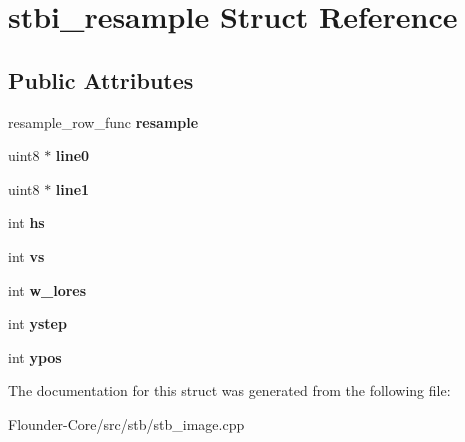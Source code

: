 \hypertarget{structstbi__resample}{}\section{stbi\+\_\+resample Struct Reference}
\label{structstbi__resample}
\subsection*{Public Attributes}
\begin{DoxyCompactItemize}
\item 
\mbox{\label{structstbi__resample_a94091463ebc5933cdaf7a813025b6e19}} 
resample\+\_\+row\+\_\+func {\bfseries resample}
\item 
\mbox{\label{structstbi__resample_a30c51395efffb663b183d7c64def6db3}} 
uint8 $\ast$ {\bfseries line0}
\item 
\mbox{\label{structstbi__resample_ac1165a6da3cf652b951056667f89b1f2}} 
uint8 $\ast$ {\bfseries line1}
\item 
\mbox{\label{structstbi__resample_a1513390ba0102364169a52ff26d5e0f2}} 
int {\bfseries hs}
\item 
\mbox{\label{structstbi__resample_a331c717f53239339c0c678f92a7bf4d5}} 
int {\bfseries vs}
\item 
\mbox{\label{structstbi__resample_a41d43c7b0d6caafbf0dfa8ef064bd2a2}} 
int {\bfseries w\+\_\+lores}
\item 
\mbox{\label{structstbi__resample_a0c479143447d103e73348c89f8b4ef1c}} 
int {\bfseries ystep}
\item 
\mbox{\label{structstbi__resample_aa1f1ad33e739f7a38fbad8752f64f983}} 
int {\bfseries ypos}
\end{DoxyCompactItemize}


The documentation for this struct was generated from the following file\+:\begin{DoxyCompactItemize}
\item 
Flounder-\/\+Core/src/stb/stb\+\_\+image.\+cpp\end{DoxyCompactItemize}
